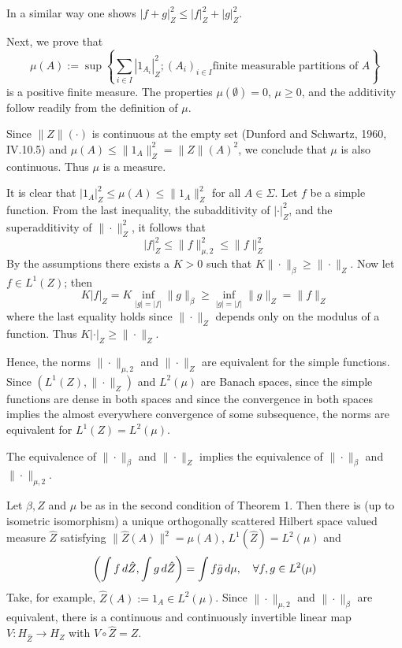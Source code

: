 \documentclass{article}
\newcommand{\assign}{:=}
\newcommand{\cdummy}{\cdot}
\begin{document}
In a similar way one shows $|f + g|_Z^2 \leq |f|_Z^2 + |g|_Z^2$.

Next, we prove that
\begin{equation}
  \mu (A) \assign \sup \left\{ \sum_{i \in I} |1_{A_i} |_Z^2 ; (A_i)_{i \in I}
  \text{finite measurable partitions of } A \right\}
\end{equation}
is a positive finite measure. The properties $\mu (\emptyset) = 0$, $\mu \geq
0$, and the additivity follow readily from the definition of $\mu$.

Since $\|Z\| (\cdummy)$ is continuous at the empty set (Dunford and Schwartz,
1960, IV.10.5) and $\mu (A) \leq \|1_A \|_Z^2 = \|Z\| (A)^2$, we conclude that
$\mu$ is also continuous. Thus $\mu$ is a measure.

It is clear that $|1_A |_Z^2 \leq \mu (A) \leq \|1_A \|_Z^2$ for all $A \in
\Sigma$. Let $f$ be a simple function. From the last inequality, the
subadditivity of $| \cdummy |_Z^2$, and the superadditivity of $\| \cdummy
\|_Z^2$, it follows that
\begin{equation}
  |f|_Z^2 \leq \|f\|_{\mu, 2}^2 \leq \|f\|_Z^2
\end{equation}
By the assumptions there exists a $K > 0$ such that $K \| \cdummy \|_{\beta}
\geq \| \cdummy \|_Z$. Now let $f \in L^1 (Z)$; then
\begin{equation}
  K |f|_Z = K \inf_{|g| = |f|} \|g\|_{\beta} \geq \inf_{|g| = |f|} \|g\|_Z =
  \|f\|_Z
\end{equation}
where the last equality holds since $\| \cdummy \|_Z$ depends only on the
modulus of a function. Thus $K | \cdummy |_Z \geq \| \cdummy \|_Z$.

Hence, the norms $\| \cdummy \|_{\mu, 2}$ and $\| \cdummy \|_Z$ are equivalent
for the simple functions. Since $(L^1 (Z), \| \cdot \|_Z)$ and $L^2 (\mu)$ are
Banach spaces, since the simple functions are dense in both spaces and since
the convergence in both spaces implies the almost everywhere convergence of
some subsequence, the norms are equivalent for $L^1 (Z) = L^2 (\mu)$.

The equivalence of $\| \cdummy \|_{\beta}$ and $\| \cdummy \|_Z$ implies the
equivalence of $\| \cdummy \|_{\beta}$ and $\| \cdummy \|_{\mu, 2}$.

Let $\beta, Z$ and $\mu$ be as in the second condition of Theorem 1. Then
there is (up to isometric isomorphism) a unique orthogonally scattered Hilbert
space valued measure $\hat{Z}$ satisfying $\| \hat{Z} (A)\|^2 = \mu (A)$, $L^1
(\hat{Z}) = L^2 (\mu)$ and
\begin{equation}
  \left( \int f \hspace{0.17em} d \hat{Z}, \int g \hspace{0.17em} d \hat{Z}
  \right) = \int f \bar{g}  \hspace{0.17em} d \mu, \quad \forall f, g \in L^2
  (\mu)
\end{equation}
Take, for example, $\hat{Z} (A) \assign 1_A \in L^2 (\mu)$. Since $\| \cdummy
\|_{\mu, 2}$ and $\| \cdummy \|_{\beta}$ are equivalent, there is a continuous
and continuously invertible linear map $V : H_{\hat{Z}} \to H_Z$ with $V \circ
\hat{Z} = Z$.
\end{document}
